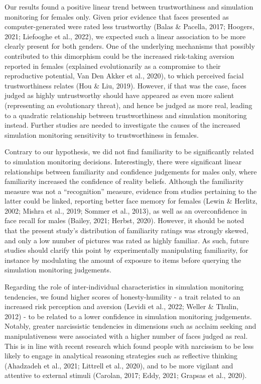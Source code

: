 \documentclass[
  man,mask,floatsintext]{apa6}
\begin{document}
Our results found a positive linear trend between trustworthiness and simulation monitoring for females only. Given prior evidence that faces presented as computer-generated were rated less trustworthy (Balas \& Pacella, 2017; Hoogers, 2021; Liefooghe et al., 2022), we expected such a linear association to be more clearly present for both genders. One of the underlying mechanisms that possibly contributed to this dimorphism could be the increased risk-taking aversion reported in females (explained evolutionarily as a compromise to their reproductive potential, Van Den Akker et al., 2020), to which perceived facial trustworthiness relates (Hou \& Liu, 2019). However, if that was the case, faces judged as highly untrustworthy should have appeared as even more salient (representing an evolutionary threat), and hence be judged as more real, leading to a quadratic relationship between trustworthiness and simulation monitoring instead. Further studies are needed to investigate the causes of the increased simulation monitoring sensitivity to trustworthiness in females.

Contrary to our hypothesis, we did not find familiarity to be significantly related to simulation monitoring decisions. Interestingly, there were significant linear relationships between familiarity and confidence judgements for males only, where familiarity increased the confidence of reality beliefs. Although the familiarity measure was not a ``recognition'' measure, evidence from studies pertaining to the latter could be linked, reporting better face memory for females (Lewin \& Herlitz, 2002; Mishra et al., 2019; Sommer et al., 2013), as well as an overconfidence in face recall for males (Bailey, 2021; Herbst, 2020). However, it should be noted that the present study's distribution of familiarity ratings was strongly skewed, and only a low number of pictures was rated as highly familiar. As such, future studies should clarify this point by experimentally manipulating familiarity, for instance by modulating the amount of exposure to items before querying the simulation monitoring judgements.

Regarding the role of inter-individual characteristics in simulation monitoring tendencies, we found higher scores of honesty-humility - a trait related to an increased risk perception and aversion (Levidi et al., 2022; Weller \& Thulin, 2012) - to be related to a lower confidence in simulation monitoring judgements. Notably, greater narcissistic tendencies in dimensions such as acclaim seeking and manipulativeness were associated with a higher number of faces judged as real. This is in line with recent research which found people with narcissism to be less likely to engage in analytical reasoning strategies such as reflective thinking (Ahadzadeh et al., 2021; Littrell et al., 2020), and to be more vigilant and attentive to external stimuli (Carolan, 2017; Eddy, 2021; Grapsas et al., 2020).
\end{document}
